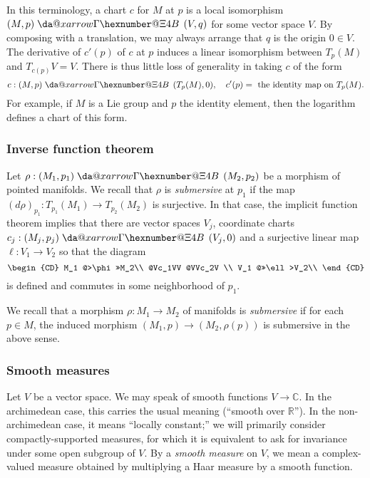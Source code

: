 \documentclass[reqno]{amsart}
\makeatletter
\newcommand*{\da@rightarrow}{\mathchar"0\hexnumber@\symAMSa 4B }
\newcommand*{\xdashrightarrow}[2][]{%
  \mathrel{%
    \mathpalette{\da@xarrow{#1}{#2}{}\da@rightarrow{\,}{}}{}%
  }%
}
\newcommand*{\da@xarrow}[7]{%
  \sbox0{$\ifx#7\scriptstyle\scriptscriptstyle\else\scriptstyle\fi#5#1#6\m@th$}%
  \sbox2{$\ifx#7\scriptstyle\scriptscriptstyle\else\scriptstyle\fi#5#2#6\m@th$}%
  \sbox4{$#7\dabar@\m@th$}%
  \dimen@=\wd0 %
  \ifdim\wd2 >\dimen@
    \dimen@=\wd2 %
  \fi
  \count@=2 %
  \def\da@bars{\dabar@\dabar@}%
  \@whiledim\count@\wd4<\dimen@\do{%
    \advance\count@\@ne
    \expandafter\def\expandafter\da@bars\expandafter{%
      \da@bars
      \dabar@ 
    }%
  }%
  \mathrel{#3}%
  \mathrel{%
    \mathop{\da@bars}\limits
    \ifx\\#1\\%
    \else
      _{\copy0}%
    \fi
    \ifx\\#2\\%
    \else
      ^{\copy2}%
    \fi
  }%
  \mathrel{#4}%
}
\theoremstyle{plain} \newtheorem{theorem} {Theorem}
\theoremstyle{definition} \newtheorem{definition} [theorem] {Definition}
\theoremstyle{itplain} %
\numberwithin{equation}{section}
\numberwithin{theorem}{section}
\makeatother
\begin{document}
In this terminology, a chart $c$ for $M$ at $p$ is a local isomorphism $(M,p) \xdashrightarrow{} (V,q)$ for some vector space $V$.  By composing with a translation, we may always arrange that $q$ is the origin $0 \in V$.  The derivative of $c'(p)$ of $c$ at $p$ induces a linear isomorphism between $T_p(M)$ and $T_{c(p)} V = V$.  There is thus little loss of generality in taking $c$ of the form
\begin{equation}\label{eq:c-:-m}
  c : (M,p) \xdashrightarrow{} (T_p(M), 0),
  \quad
  c'(p) = \text{ the identity map on } T_p(M).
\end{equation}
For example, if $M$ is a Lie group and $p$ the identity element, then the logarithm defines a chart of this form.


\subsubsection{Inverse function theorem}\label{sec:inverse-funct-theor}
Let $\rho : (M_1, p_1) \xdashrightarrow{} (M_2, p_2)$ be a morphism of pointed manifolds.  We recall that $\rho$ is \emph{submersive} at $p_1$ if the map $(d \rho)_{p_1} : T_{p_1}(M_1) \rightarrow T_{p_2}(M_2)$ is surjective.  In that case, the implicit function theorem implies that there are vector spaces $V_j$, coordinate charts $c_j : (M_j, p_j) \xdashrightarrow{} (V_j,0)$ and a surjective linear map $\ell : V_1 \rightarrow V_2$ so that the diagram
\begin{equation*}
  \begin{CD}         
    M_1 @>\phi>>M_2\\
    @Vc_1VV  @VVc_2V \\
    V_1 @>>\ell>V_2\\
  \end{CD}
\end{equation*}
is defined and commutes in some neighborhood of $p_1$.

We recall that a morphism $\rho : M_1 \rightarrow M_2$ of manifolds is \emph{submersive} if for each $p \in M$, the induced morphism $(M_1, p) \rightarrow (M_2, \rho(p))$ is submersive in the above sense.

\subsubsection{Smooth measures}
Let $V$ be a vector space.  We may speak of smooth functions $V \rightarrow \mathbb{C}$.  In the archimedean case, this carries the usual meaning (``smooth over $\mathbb{R}$'').  In the non-archimedean case, it means ``locally constant;'' we will primarily consider compactly-supported measures, for which it is equivalent to ask for invariance under some open subgroup of $V$.  By a \emph{smooth measure} on $V$, we mean a complex-valued measure obtained by multiplying a Haar measure by a smooth function.
\end{document}
